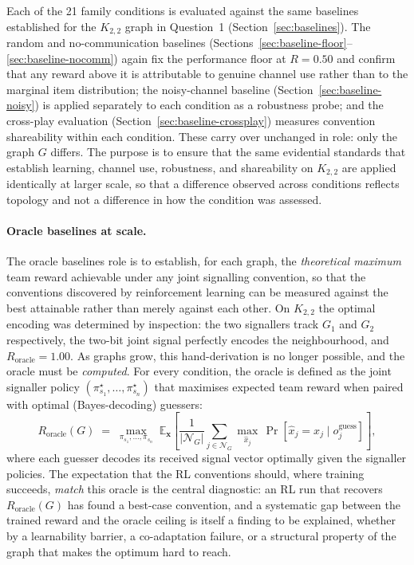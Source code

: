 \documentclass[a4paper,twoside,12pt]{report}
\begin{document}
    Each of the 21 family conditions is evaluated against the same baselines  established for the $K_{2,2}$ graph in Question~1
    (Section~\ref{sec:baselines}). The random and no-communication baselines
    (Sections~\ref{sec:baseline-floor}--\ref{sec:baseline-nocomm}) again fix
    the performance floor at $R = 0.50$ and confirm that any reward above it is
    attributable to genuine channel use rather than to the marginal item
    distribution; the noisy-channel baseline
    (Section~\ref{sec:baseline-noisy}) is applied separately to each condition
    as a robustness probe; and the cross-play evaluation
    (Section~\ref{sec:baseline-crossplay}) measures convention shareability
    within each condition. These carry over unchanged in role: only the graph
    $G$ differs. The purpose is to ensure that the same evidential standards
    that establish learning, channel use, robustness, and shareability on
    $K_{2,2}$ are applied identically at larger scale, so that a difference
    observed across conditions reflects topology and not a difference in how
    the condition was assessed.
    
    \paragraph{Oracle baselines at scale.}
    The oracle baselines role is to establish, for each graph, the
    \emph{theoretical maximum} team reward achievable under any joint
    signalling convention, so that the conventions discovered by reinforcement
    learning can be measured against the best attainable rather than merely
    against each other. On $K_{2,2}$ the optimal encoding was determined by
    inspection: the two signallers track $G_1$ and $G_2$ respectively, the
    two-bit joint signal perfectly encodes the neighbourhood, and
    $R_{\mathrm{oracle}} = 1.00$. As graphs grow, this hand-derivation is no
    longer possible, and the oracle must be \emph{computed}. For every
    condition, the oracle is defined as the joint signaller policy
    $(\pi_{s_1}^\star, \ldots, \pi_{s_n}^\star)$ that maximises expected team
    reward when paired with optimal (Bayes-decoding) guessers:
    \begin{equation}
        R_{\mathrm{oracle}}(G) \;=\;
        \max_{\pi_{s_1}, \ldots, \pi_{s_n}}\;
        \mathbb{E}_{\mathbf{x}}\!\left[
        \frac{1}{|\mathcal{N}_G|}
        \sum_{j \in \mathcal{N}_G}
        \max_{\hat{x}_j}\,
        \Pr\!\left[\hat{x}_j = x_j \mid o_j^{\mathrm{guess}}\right]
        \right],
    \end{equation}
    where each guesser decodes its received signal vector optimally given the
    signaller policies. The expectation that the RL conventions should, where
    training succeeds, \emph{match} this oracle is the central diagnostic: an
    RL run that recovers $R_{\mathrm{oracle}}(G)$ has found a best-case
    convention, and a systematic gap between the trained reward and the oracle
    ceiling is itself a finding to be explained, whether by a learnability
    barrier, a co-adaptation failure, or a structural property of the graph
    that makes the optimum hard to reach.
    
\end{document}
